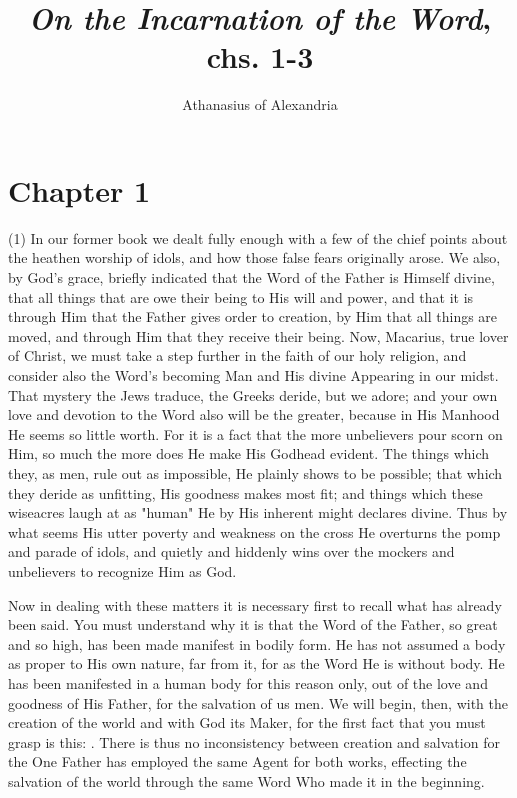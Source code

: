 \documentclass[9pt, twocolumn, oneside, a4paper]{memoir}
\title{\textit{On the Incarnation of the Word}, chs. 1-3}
\author{ Athanasius of Alexandria}
\date{}
\begin{document}
\maketitle
\section*{Chapter 1}



\textsc{(1) }In our former book       we dealt fully enough with a few of the chief points about the       heathen worship of idols, and how those false fears originally arose. We also,       by God's grace, briefly indicated that the Word of the Father is Himself divine,       that all things that are owe their being to His will and power, and that it is       through Him that the Father gives order to creation, by Him that all things are       moved, and through Him that they receive their being. Now, Macarius, true lover       of Christ, we must take a step further in the faith of our holy religion, and       consider also the Word's becoming Man and His divine Appearing in our midst.       That mystery the Jews traduce, the Greeks deride, but we adore; and your own       love and devotion to the Word also will be the greater, because in His Manhood       He seems so little worth. For it is a fact that the more unbelievers pour scorn       on Him, so much the more does He make His Godhead evident. The things which       they, as men, rule out as impossible, He plainly shows to be possible; that       which they deride as unfitting, His goodness makes most fit; and things which       these wiseacres laugh at as "human" He by His inherent might declares divine.       Thus by what seems His utter poverty and weakness on the cross He overturns the       pomp and parade of idols, and quietly and hiddenly wins over the mockers and       unbelievers to recognize Him as God.   

Now in dealing with these matters it is necessary first to recall what has       already been said. You must understand why it is that the Word of the Father, so       great and so high, has been made manifest in bodily form. He has not assumed a       body as proper to His own nature, far from it, for as the Word He is without       body. He has been manifested in a human body for this reason only, out of the       love and goodness of His Father, for the salvation of us men. We will begin,       then, with the creation of the world and with God its Maker, for the first fact       that you must grasp is this: . There is thus no inconsistency between creation and salvation for the One Father has       employed the same Agent for both works, effecting the salvation of the world       through the       same Word Who made it in the beginning.   
\end{document}
